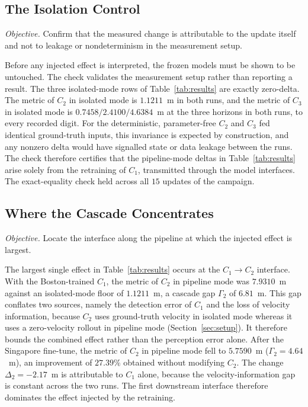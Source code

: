 \documentclass[conference]{IEEEtran}
\begin{document}
\subsection{The Isolation Control}
\label{sec:res-iso}
\emph{Objective.} Confirm that the measured change is attributable to the update
itself and not to leakage or nondeterminism in the measurement setup.

Before any injected effect is interpreted, the frozen models must be shown to be
untouched. The check validates the measurement setup rather than reporting a result. The
three isolated-mode rows of Table~\ref{tab:results} are exactly zero-delta. The
metric of $C_2$ in isolated mode is $1.1211$~m in both runs, and the metric of
$C_3$ in isolated mode is $0.7458 / 2.4100 / 4.6384$~m at the three horizons in
both runs, to every recorded digit. For the deterministic, parameter-free $C_2$
and $C_3$ fed identical ground-truth inputs, this invariance is expected by
construction, and any nonzero delta would have signalled state or data leakage
between the runs. The check therefore certifies that the pipeline-mode deltas in
Table~\ref{tab:results} arise solely from the retraining of $C_1$, transmitted
through the model interfaces. The exact-equality check held across all $15$
updates of the campaign.

\subsection{Where the Cascade Concentrates}
\label{sec:res-interface}
\emph{Objective.} Locate the interface along the pipeline at which the injected
effect is largest.

The largest single effect in Table~\ref{tab:results} occurs at the
$C_1 \to C_2$ interface. With the Boston-trained $C_1$, the metric of $C_2$ in
pipeline mode was $7.9310$~m against an isolated-mode floor of $1.1211$~m, a
cascade gap $\Gamma_2$ of $6.81$~m. This gap conflates two sources, namely the
detection error of $C_1$ and the loss of velocity information, because $C_2$ uses
ground-truth velocity in isolated mode whereas it uses a zero-velocity rollout in
pipeline mode (Section~\ref{sec:setup}). It therefore bounds the combined effect
rather than the perception error alone. After the Singapore fine-tune, the metric
of $C_2$ in pipeline mode fell to $5.7590$~m ($\Gamma_2 = 4.64$~m), an improvement
of $27.39\%$ obtained without modifying $C_2$. The change $\Delta_2 = -2.17$~m is
attributable to $C_1$ alone, because the velocity-information gap is constant
across the two runs. The first downstream interface therefore dominates the
effect injected by the retraining.
\end{document}

